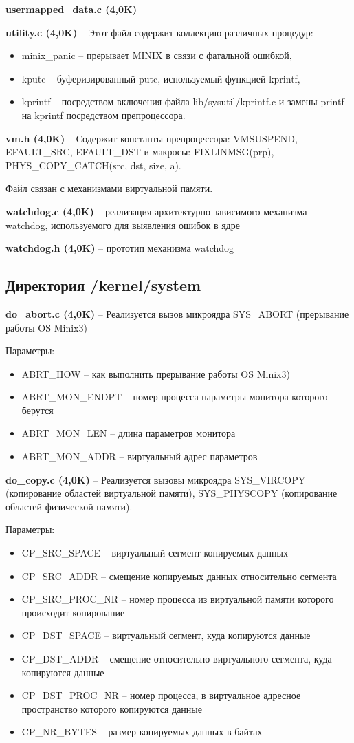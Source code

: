 \textbf{usermapped\_data.c (4,0K)}

\textbf{utility.c (4,0K)} -- Этот файл содержит коллекцию различных процедур:
\begin{itemize}
\item minix\_panic -- прерывает MINIX в связи с фатальной ошибкой,
\item kputc -- буферизированный putc, используемый функцией kprintf,
\item kprintf -- посредством включения файла lib/sysutil/kprintf.c и замены printf на kprintf посредством препроцессора.
\end{itemize}

\textbf{vm.h (4,0K)} -- Содержит константы препроцессора: VMSUSPEND, EFAULT\_SRC, EFAULT\_DST и макросы: FIXLINMSG(prp), PHYS\_COPY\_CATCH(src, dst, size, a).

Файл связан с механизмами виртуальной памяти.

\textbf{watchdog.c (4,0K)} -- реализация архитектурно-зависимого механизма watchdog, используемого для выявления ошибок в ядре

\textbf{watchdog.h (4,0K)} -- прототип механизма watchdog

\subsection{Директория /kernel/system}

\textbf{do\_abort.c (4,0K)} -- Реализуется вызов микроядра SYS\_ABORT (прерывание работы OS Minix3)

Параметры:
\begin{itemize}
\item ABRT\_HOW -- как выполнить прерывание работы OS Minix3)
\item ABRT\_MON\_ENDPT -- номер процесса параметры монитора которого берутся
\item ABRT\_MON\_LEN -- длина параметров монитора
\item ABRT\_MON\_ADDR -- виртуальный адрес параметров
\end{itemize}

\textbf{do\_copy.c (4,0K)} -- Реализуется вызовы микроядра SYS\_VIRCOPY (копирование областей виртуальной памяти), SYS\_PHYSCOPY (копирование областей физической памяти).

Параметры:
\begin{itemize}
\item CP\_SRC\_SPACE -- виртуальный сегмент копируемых данных
\item CP\_SRC\_ADDR -- смещение копируемых данных относительно сегмента
\item CP\_SRC\_PROC\_NR -- номер процесса из виртуальной памяти которого происходит копирование
\item CP\_DST\_SPACE -- виртуальный сегмент, куда копируются данные
\item CP\_DST\_ADDR -- смещение относительно виртуального сегмента, куда копируются данные
\item CP\_DST\_PROC\_NR -- номер процесса, в виртуальное адресное пространство которого копируются данные
\item CP\_NR\_BYTES -- размер копируемых данных в байтах
\end{itemize}

